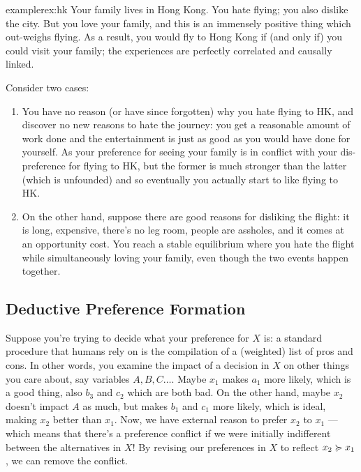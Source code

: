 \documentclass{article}
\begin{document}
	\begin{restatable}{example}{rex:hk} \label{rex:hk}
		Your family lives in Hong Kong. You hate flying; you also dislike the city. But you love your family, and this is an immensely positive thing which out-weighs flying. As a result, you would fly to Hong Kong if (and only if) you could visit your family; the experiences are perfectly correlated and causally linked.
		
		Consider two cases:
		\begin{enumerate}[nosep]
			\item You have no reason (or have since forgotten) why you hate flying to HK, and discover no new reasons to hate the journey: you get a reasonable amount of work done and the entertainment is just as good as you would have done for yourself. As your preference for seeing your family is in conflict with your dis-preference for flying to HK, but the former is much stronger than the latter (which is unfounded) and so eventually you actually start to like flying to HK.
			\item On the other hand, suppose there are good reasons for disliking the flight: it is long, expensive, there's no leg room, people are assholes, and it comes at an opportunity cost. You reach a stable equilibrium where you hate the flight while simultaneously loving your family, even though the two events happen together.
		\end{enumerate}
	\end{restatable}
	
	
	\subsection{Deductive Preference Formation}
	Suppose you're trying to decide what your preference for $X$ is: a standard procedure that humans rely on is the compilation of a (weighted) list of pros and cons. In other words, you examine the impact of a decision in $X$ on other things you care about, say variables $A, B, C\ldots$. Maybe $x_1$ makes $a_1$ more likely, which is a good thing, also $b_3$ and $c_2$ which are both bad. On the other hand, maybe $x_2$ doesn't impact $A$ as much, but makes $b_1$ and $c_1$ more likely, which is ideal, making $x_2$ better than $x_1$. Now, we have external reason to prefer $x_2$ to $x_1$ --- which means that there's a preference conflict if we were initially indifferent between the alternatives in $X$! By revising our preferences in $X$ to reflect $x_2 \succcurlyeq x_1$, we can remove the conflict. 
\end{document}
